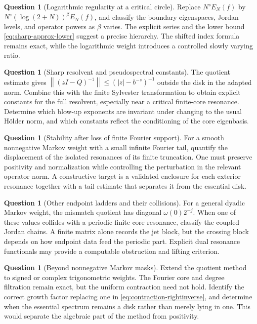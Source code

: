 \documentclass[11pt,a4paper]{article}
\numberwithin{equation}{section}
\theoremstyle{definition}
\newtheorem{question}[theorem]{Question}
\theoremstyle{remark}
\newcommand{\norm}[1]{\left\lVert#1\right\rVert}
\begin{document}
\begin{question}[Logarithmic regularity at a critical circle]
Replace $N^sE_N(f)$ by
$N^s(\log(2+N))^\beta E_N(f)$, and classify the boundary eigenspaces,
Jordan levels, and operator powers as $\beta$ varies. The explicit
series and the lower bound \eqref{eq:sharp-approx-lower} suggest a
precise hierarchy. The shifted index formula remains exact, while the
logarithmic weight introduces a controlled slowly varying ratio.
\end{question}

\begin{question}[Sharp resolvent and pseudospectral constants]
The quotient estimate gives
$\norm{(zI-Q)^{-1}}\le(|z|-b^{-s})^{-1}$ outside the disk in the
adapted norm. Combine this with the finite Sylvester transformation to
obtain explicit constants for the full resolvent, especially near a
critical finite-core resonance. Determine which blow-up exponents
are invariant under changing to the usual H\"older norm, and which
constants reflect the conditioning of the core eigenbasis.
\end{question}

\begin{question}[Stability after loss of finite Fourier support]
For a smooth nonnegative Markov weight with a small infinite Fourier
tail, quantify the displacement of the isolated resonances of its
finite truncation. One must preserve positivity and normalization
while controlling the perturbation in the relevant operator norm.
A constructive target is a validated enclosure for each exterior
resonance together with a tail estimate that separates it from the
essential disk.
\end{question}

\begin{question}[Other endpoint ladders and their collisions]
For a general dyadic Markov weight, the mismatch quotient has diagonal
$\omega(0)2^{-j}$. When one of these values collides with a periodic
finite-core resonance, classify the coupled Jordan chains. A finite
matrix alone records the jet block, but the crossing block depends on
how endpoint data feed the periodic part. Explicit dual resonance
functionals may provide a computable obstruction and lifting criterion.
\end{question}

\begin{question}[Beyond nonnegative Markov masks]
Extend the quotient method to signed or complex trigonometric weights.
The Fourier core and degree filtration remain exact, but the uniform
contraction need not hold. Identify the correct growth factor replacing
one in \eqref{eq:contraction-rightinverse}, and determine when the
essential spectrum remains a disk rather than merely lying in one.
This would separate the algebraic part of the method from positivity.
\end{question}
\end{document}
